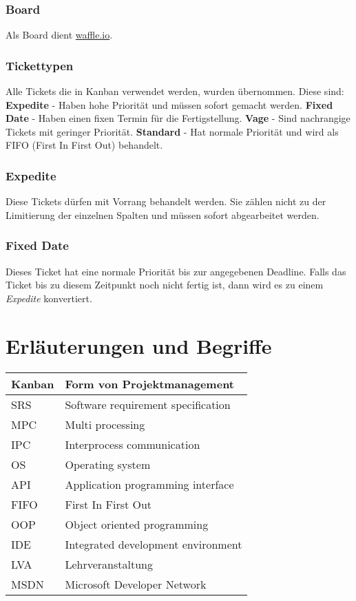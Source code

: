 \documentclass[a4paper]{book}
\begin{document}
\subsubsection{Board}
Als Board dient \href{https://waffle.io/chronos38/libipc-}{waffle.io}.

\subsubsection{Tickettypen}
Alle Tickets die in Kanban verwendet werden, wurden übernommen. Diese sind:\newline
\textbf{Expedite} - Haben hohe Priorität und müssen sofort gemacht werden.\newline
\textbf{Fixed Date} - Haben einen fixen Termin für die Fertigstellung.\newline
\textbf{Vage} - Sind nachrangige Tickets mit geringer Priorität.\newline
\textbf{Standard} - Hat normale Priorität und wird als FIFO (First In First Out) behandelt.

\subsubsection{Expedite}
Diese Tickets dürfen mit Vorrang behandelt werden. Sie zählen nicht zu der Limitierung der einzelnen Spalten und müssen sofort abgearbeitet werden.

\subsubsection{Fixed Date}
Dieses Ticket hat eine normale Priorität bis zur angegebenen Deadline. Falls das Ticket bis zu diesem Zeitpunkt noch nicht fertig ist, dann wird es zu einem \textit{Expedite} konvertiert.

\section{Erläuterungen und Begriffe}
\begin{center}
\begin{longtable}{|p{3cm}|p{8cm}|}
\hline
Kanban & Form von Projektmanagement \\
\hline
SRS & Software requirement specification \\
\hline
MPC & Multi processing \\
\hline
IPC & Interprocess communication \\
\hline
OS & Operating system \\
\hline
API & Application programming interface \\
\hline
FIFO & First In First Out \\
\hline
OOP & Object oriented programming \\
\hline
IDE & Integrated development environment \\
\hline
LVA & Lehrveranstaltung \\
\hline
MSDN & Microsoft Developer Network \\
\hline
\end{longtable}
\end{center}
\end{document}
